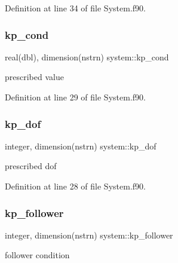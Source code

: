 Definition at line 34 of file System.\+f90.

\mbox{\label{namespacesystem_a52739e5016f753e4d31c5f933aa2b79a}} 
\subsubsection{\texorpdfstring{kp\+\_\+cond}{kp\_cond}}
{\footnotesize\ttfamily real(dbl), dimension(nstrn) system\+::kp\+\_\+cond\hspace{0.3cm}{\ttfamily [private]}}



prescribed value 



Definition at line 29 of file System.\+f90.

\mbox{\label{namespacesystem_a1ec6fa7d33c56b907f960706f2c49a97}} 
\subsubsection{\texorpdfstring{kp\+\_\+dof}{kp\_dof}}
{\footnotesize\ttfamily integer, dimension(nstrn) system\+::kp\+\_\+dof\hspace{0.3cm}{\ttfamily [private]}}



prescribed dof 



Definition at line 28 of file System.\+f90.

\mbox{\label{namespacesystem_af7b15e252e65635b4d03452e4c717697}} 
\subsubsection{\texorpdfstring{kp\+\_\+follower}{kp\_follower}}
{\footnotesize\ttfamily integer, dimension(nstrn) system\+::kp\+\_\+follower\hspace{0.3cm}{\ttfamily [private]}}



follower condition 



